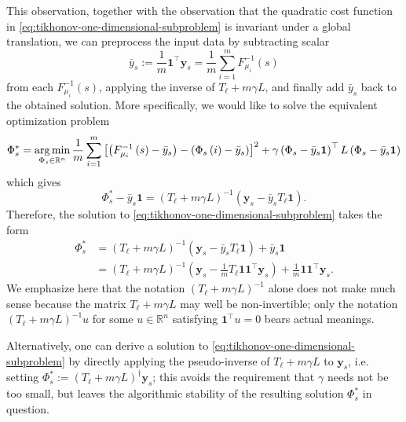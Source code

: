 \documentclass[letterpaper]{article} %
\begin{document}
This observation, together with the observation that the quadratic cost function in \eqref{eq:tikhonov-one-dimensional-subproblem} is invariant under a global translation, we can preprocess the input data by subtracting scalar
\begin{equation}
  \label{eq:off-set-defn}
  \bar{y}_s := \frac{1}{m}\mathbf{1}^{\top}\mathbf{y}_s=\frac{1}{m}\sum_{i=1}^mF_{\mu_i}^{-1}\left( s \right)
\end{equation}
from each $F_{\mu_i}^{-1}\left( s \right)$, applying the inverse of $T_\ell+m\gamma L$, and finally add $\bar{y}_s$ back to the obtained solution. More specifically, we would like to solve the equivalent optimization problem
\begin{equation}
  \label{eq:tikhonov-one-dimensional-subproblem-equiv}
  \Phi_s^*=\mathop{\rm arg\, min}_{\Phi_s\in\mathbb{R}^n}\frac{1}{m}\sum_{i=1}^m \left[\left( F_{\mu_i}^{-1}\left( s \right)-\bar{y}_s\right)-\left(\Phi_s \left( i \right)-\bar{y}_s \right)\right]^2+\gamma \left(\Phi_s-\bar{y}_s\mathbf{1}\right)^{\top}L\left(\Phi_s-\bar{y}_s\mathbf{1}\right)
\end{equation}
which gives
\begin{equation*}
  \Phi_s^*-\bar{y}_s\mathbf{1}=\left( T_{\ell}+m\gamma L \right)^{-1}\left(\mathbf{y}_s-\bar{y}_sT_\ell\mathbf{1}\right).
\end{equation*}
Therefore, the solution to \eqref{eq:tikhonov-one-dimensional-subproblem} takes the form
\begin{equation}
  \label{eq:sol-tikhonov-one-dimensional-subproblem}
  \begin{aligned}
    \Phi_s^{*}&=\left( T_{\ell}+m\gamma L \right)^{-1}\left(\mathbf{y}_s-\bar{y}_sT_\ell\mathbf{1}\right)+\bar{y}_s\mathbf{1}\\
    &=\left( T_{\ell}+m\gamma L \right)^{-1}\left(\mathbf{y}_s-\frac{1}{m} T_\ell\mathbf{1}\mathbf{1}^{\top}\mathbf{y}_s\right)+\frac{1}{m}\mathbf{1}\mathbf{1}^{\top}\mathbf{y}_s.
  \end{aligned}
\end{equation}
We emphasize here that the notation $\left( T_{\ell}+m\gamma L \right)^{-1}$ alone does not make much sense because the matrix $T_{\ell}+m\gamma L$ may well be non-invertible; only the notation $\left( T_{\ell}+m\gamma L \right)^{-1}u$ for some $u\in\mathbb{R}^n$ satisfying $\mathbf{1}^{\top}u=0$ bears actual meanings.
\begin{remark}
  Alternatively, one can derive a solution to \eqref{eq:tikhonov-one-dimensional-subproblem} by directly applying the pseudo-inverse of $T_{\ell}+m\gamma L$ to $\mathbf{y}_s$, i.e. setting $\Phi_s^{*}:=\left( T_{\ell}+m\gamma L \right)^{\dagger}\mathbf{y}_s$; this avoids the requirement that $\gamma$ needs not be too small, but leaves the algorithmic stability of the resulting solution $\Phi_s^{*}$ in question.
\end{remark}
\end{document}
